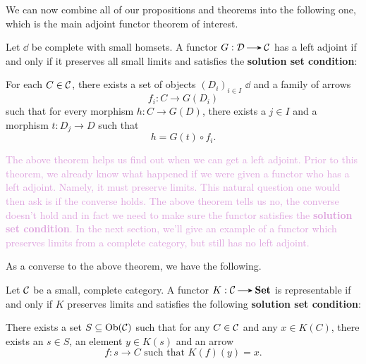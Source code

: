     We can now combine all of our propositions and theorems into the following 
    one, which is the main adjoint functor theorem of interest. 

    \begin{thm}
        Let $\dd$ be complete with small homsets. A functor 
        $G: \dd \to \cc$ has a left adjoint if and only if it preserves all small 
        limits and satisfies the \textbf{solution set condition}: 
        \begin{center}
            \begin{minipage}{0.9\textwidth}
                For each $C \in \mathcal{C}$, 
                there exists a set of objects $(D_i)_{i \in I}$ $\dd$ and a family 
                of arrows
                \[
                    f_i: C \to G(D_i)
                \]
                such that for every morphism $h: C \to G(D)$, there 
                exists a $j \in I$ and a morphism $t: D_j \to D$ such that
                \[
                    h = G(t) \circ f_i.
                \]
            \end{minipage}  
        \end{center}
    \end{thm}

    \textcolor{Plum}{The above theorem helps us find out when we can get a 
    left adjoint. Prior to this theorem, we already know what happened if 
    we were given a functor who has a left adjoint. Namely, it must preserve 
    limits. This natural question one would then ask is if
    the converse holds. The above theorem tells us no, the converse doesn't hold 
    and in fact we need to make sure the functor satisfies the \textbf{solution 
    set condition}. In the next section, we'll give an example of a functor 
    which preserves limits from a complete category, but still has no left adjoint.}

    As a converse to the above theorem, we have the following. 

    \begin{thm}
        Let $\mathcal{C}$ be a small, complete category. A functor $K: \cc \to 
        \textbf{Set}$ is representable if and only if $K$ preserves limits 
        and satisfies the following \textbf{solution set condition}: 
        \begin{center}
            \begin{minipage}{0.9\textwidth}
                There exists a set $S \subseteq \operatorname{\mathrm{Ob}}(\mathcal{C})$ such that for any 
                $C \in \mathcal{C}$ and any $x \in K(C)$, there exists an $s \in S$, 
                an element $y \in K(s)$ and an arrow 
                \[
                    f: s \to C \text{ such that } K(f)(y) = x.
                \]
            \end{minipage}
        \end{center}
    \end{thm}

